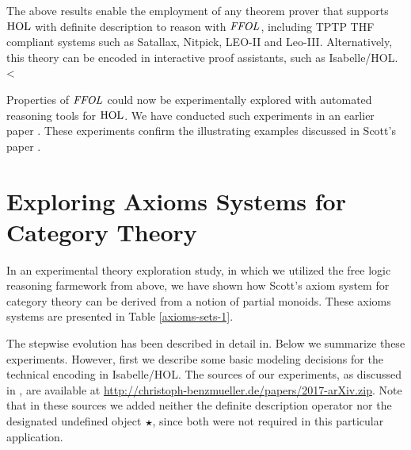 


The above results enable the employment of any theorem prover that
supports $\text{\textrm{HOL}}$ with definite description to reason with $\mathit{FFOL}$,
including TPTP THF \cite{J22} compliant systems such as Satallax,
Nitpick, LEO-II and Leo-III. Alternatively, this theory can be encoded
in interactive proof assistants, such as Isabelle/HOL. <

Properties of $\mathit{FFOL}$ could now be experimentally explored with
automated reasoning tools for $\text{\textrm{HOL}}$. We have conducted such
experiments in 
an earlier paper \cite{ICMS}. These experiments confirm the
illustrating examples discussed in Scott's paper \cite{Scott67}.


\section{Exploring Axioms Systems for Category Theory}
In an experimental theory exploration study, in which we utilized the
free logic reasoning farmework from above, 
we have shown how Scott's
\cite{Scott79} axiom system for category theory can be derived from a
notion of partial monoids. These axioms systems are presented in Table \ref{axioms-sets-1}.

The stepwise evolution has been described in detail
in\cite{ArXiv}. Below we summarize these experiments.  However, first
we describe some basic modeling decisions for the technical encoding
in Isabelle/HOL. The sources of our experiments, as discussed in
\cite{ArXiv}, are available at
\url{http://christoph-benzmueller.de/papers/2017-arXiv.zip}. Note that
in these sources we added neither the definite description operator
nor the designated undefined object $\boldsymbol{\star}$, since both were not
required in this particular application.

